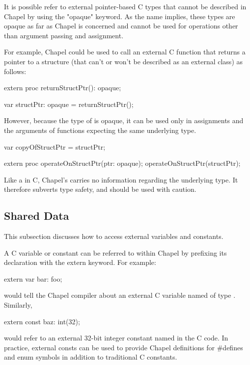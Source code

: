 It is possible refer to external pointer-based C types that cannot be
described in Chapel by using the "opaque" keyword.  As the name implies,
these types are opaque as far as Chapel is concerned and cannot be
used for operations other than argument passing and assignment.

For example, Chapel could be used to call an external C function that
returns a pointer to a structure (that can't or won't be described as
an external class) as follows:
\begin{chapel}
    extern proc returnStructPtr(): opaque;

    var structPtr: opaque = returnStructPtr();
\end{chapel}

However, because the type of  is opaque, it can be used only in
assignments and the arguments of functions expecting the same underlying type.
\begin{chapel}
    var copyOfStructPtr = structPtr;

    extern proc operateOnStructPtr(ptr: opaque);
    operateOnStructPtr(structPtr);
\end{chapel}
\noindent
Like a  in C, Chapel's  carries no information
regarding the underlying type.  It therefore subverts type safety, and should be
used with caution.

\subsection{Shared Data}
\label{Shared_Data}

This subsection discusses how to access external variables and constants.

A C variable or constant can be referred to within Chapel by prefixing
its declaration with the extern keyword.  For example:
\begin{chapel}
    extern var bar: foo;
\end{chapel}
\noindent
would tell the Chapel compiler about an external C variable named
 of type .  Similarly, 
\begin{chapel}
   extern const baz: int(32);
\end{chapel}
would refer to an external 32-bit integer constant named  in the
C code.  In practice, external consts can be used to provide Chapel
definitions for \#defines and enum symbols in addition to traditional C
constants.

